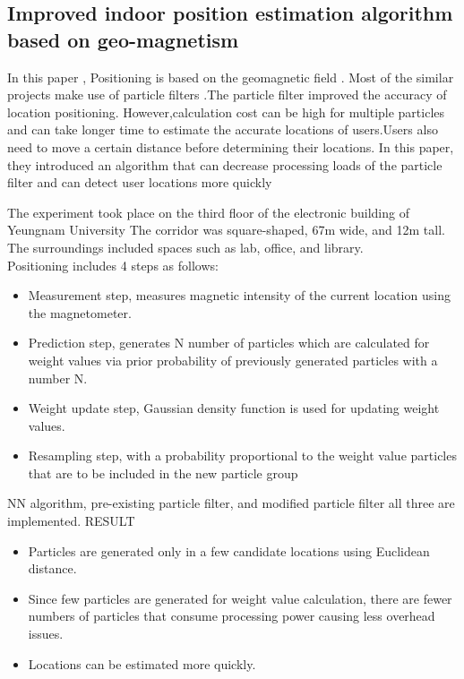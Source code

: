 \documentclass[a4paper, 12pt]{article}
\begin{document}
\subsection{Improved indoor position estimation algorithm based on geo-magnetism }
\hspace{1cm} 
In this paper , Positioning is based on the geomagnetic field . Most of the similar projects make use of particle filters .The particle filter improved the accuracy of location positioning. However,calculation cost can be high for multiple particles and can take longer time to estimate the accurate locations of users.Users also need to move a certain distance before determining their locations.  In this paper, they introduced an algorithm that can decrease processing loads of the particle filter and can detect user locations more quickly\\
\par The experiment took place on the third floor of the electronic building of Yeungnam University The corridor was square-shaped, 67m wide, and 12m tall. The surroundings included spaces such as lab, office, and library.
\\
Positioning includes 4 steps as follows:
\begin{itemize}
	\item Measurement step, measures magnetic intensity of the current location using the magnetometer. 
	\item	Prediction step,  generates N number of particles which are calculated for weight values via prior probability of previously generated particles with a number N.
	\item	Weight update step, Gaussian density function is used for updating weight values.
	\item	Resampling step, with a probability proportional to the weight value  particles that are to be included in the new particle group 		
\end{itemize}
NN algorithm, pre-existing particle filter, and modified particle filter all three are implemented.
\linebreak
\linebreak
RESULT
\begin{itemize}
	\item Particles are generated only in a few candidate locations using Euclidean distance. 
	\item	Since few particles are generated for weight value calculation, there are fewer numbers of particles that consume processing power causing less overhead issues. 
	\item Locations can be estimated more quickly. 	
\end{itemize}
\end{document}
